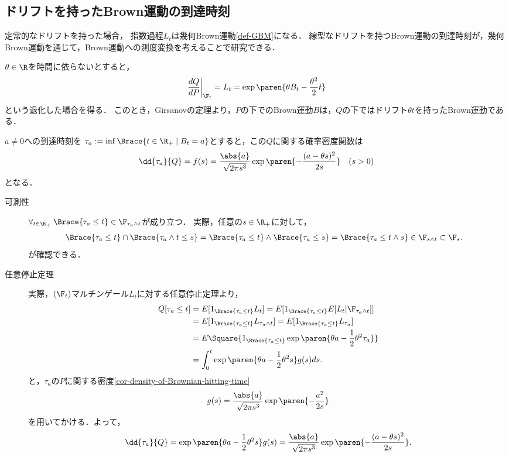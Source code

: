 \documentclass[uplatex,dvipdfmx]{jsreport}
\begin{document}
\subsection{ドリフトを持ったBrown運動の到達時刻}

\begin{tcolorbox}[colframe=ForestGreen, colback=ForestGreen!10!white,breakable,colbacktitle=ForestGreen!40!white,coltitle=black,fonttitle=\bfseries\sffamily,
title=]
    定常的なドリフトを持った場合，
    指数過程$L_t$は幾何Brown運動\ref{def-GBM}になる．
    線型なドリフトを持つBrown運動の到達時刻が，幾何Brown運動を通じて，Brown運動への測度変換を考えることで研究できる．
\end{tcolorbox}

\begin{notation}
    $\theta\in\R$を時間に依らないとすると，
    \[\left.\frac{dQ}{dP}\right|_{\F_t}=L_t=\exp\paren{\theta B_t-\frac{\theta^2}{2}t}\]
    という退化した場合を得る．
    このとき，Girsanovの定理より，$P$の下でのBrown運動$B$は，$Q$の下ではドリフト$\theta t$を持ったBrown運動である．
\end{notation}

\begin{proposition}
    $a\ne0$への到達時刻を
    $\tau_a:=\inf\Brace{t\in\R_+\mid B_t=a}$とすると，この$Q$に関する確率密度関数は
    \[\dd{\tau_a}{Q}=f(s)=\frac{\abs{a}}{\sqrt{2\pi s^3}}\exp\paren{-\frac{(a-\theta s)^2}{2s}}\quad(s>0)\]
    となる．
\end{proposition}
\begin{Proof}\mbox{}
    \begin{description}
        \item[可測性] $\forall_{t\in\R_+}\;\Brace{\tau_a\le t}\in\F_{\tau_a\land t}$が成り立つ．
        実際，任意の$s\in\R_+$に対して，
        \begin{align*}
            \Brace{\tau_a\le t}\cap\Brace{\tau_a\land t\le s}&=\Brace{\tau_a\le t}\land\Brace{\tau_a\le s}=\Brace{\tau_a\le t\land s}\in\F_{s\land t}\subset\F_s.
        \end{align*}
        が確認できる．
        \item[任意停止定理] 実際，$(\F_t)$マルチンゲール$L_t$に対する任意停止定理より，
        \begin{align*}
            Q[\tau_a\le t]&=E[1_{\Brace{\tau_a\le t}}L_t]=E[1_{\Brace{\tau_a\le t}}E[L_t|\F_{\tau_a\land t}]]\\
            &=E[1_{\Brace{\tau_a\le t}}L_{\tau_a\land t}]=E[1_{\Brace{\tau_a\le t}}L_{\tau_a}]\\
            &=E\Square{1_{\Brace{\tau_a\le t}}\exp\paren{\theta a-\frac{1}{2}\theta^2\tau_a}}\\
            &=\int^t_0\exp\paren{\theta a-\frac{1}{2}\theta^2s}g(s)ds.
        \end{align*}
        と，$\tau_a$の$P$に関する密度\ref{cor-density-of-Brownian-hitting-time}
        \[g(s)=\frac{\abs{a}}{\sqrt{2\pi s^3}}\exp\paren{-\frac{a^2}{2s}}\]
        を用いてかける．よって，
        \[\dd{\tau_a}{Q}=\exp\paren{\theta a-\frac{1}{2}\theta^2s}g(s)=\frac{\abs{a}}{\sqrt{2\pi s^3}}\exp\paren{-\frac{(a-\theta s)^2}{2s}}.\]
    \end{description}
\end{Proof}
\end{document}
